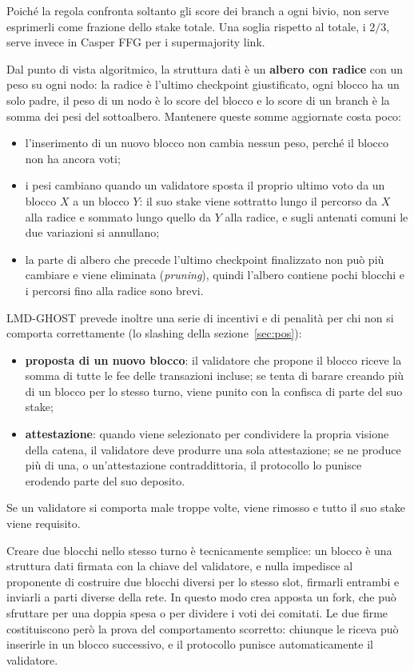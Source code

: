 \documentclass[a4paper, 11pt, oneside]{book}
\begin{document}
	Poiché la regola confronta soltanto gli score dei branch a ogni bivio, non serve
	esprimerli come frazione dello stake totale. Una soglia rispetto al totale, i $2/3$,
	serve invece in Casper FFG per i supermajority link.

	Dal punto di vista algoritmico, la struttura dati è un \textbf{albero con radice} con
	un peso su ogni nodo: la radice è l'ultimo checkpoint giustificato, ogni blocco ha un
	solo padre, il peso di un nodo è lo score del blocco e lo score di un branch è la
	somma dei pesi del sottoalbero. Mantenere queste somme aggiornate costa poco:
	\begin{itemize}
		\item l'inserimento di un nuovo blocco non cambia nessun peso, perché il blocco non
			ha ancora voti;
		\item i pesi cambiano quando un validatore sposta il proprio ultimo voto da un
			blocco $X$ a un blocco $Y$: il suo stake viene sottratto lungo il percorso da
			$X$ alla radice e sommato lungo quello da $Y$ alla radice, e sugli antenati
			comuni le due variazioni si annullano;
		\item la parte di albero che precede l'ultimo checkpoint finalizzato non può più
			cambiare e viene eliminata (\textit{pruning}), quindi l'albero contiene pochi
			blocchi e i percorsi fino alla radice sono brevi.
	\end{itemize}

	LMD-GHOST prevede inoltre una serie di incentivi e di penalità per chi non si
	comporta correttamente (lo slashing della sezione~\ref{sec:pos}):
	\begin{itemize}
		\item \textbf{proposta di un nuovo blocco}: il validatore che propone il blocco
			riceve la somma di tutte le fee delle transazioni incluse; se tenta di barare
			creando più di un blocco per lo stesso turno, viene punito con la confisca di
			parte del suo stake;
		\item \textbf{attestazione}: quando viene selezionato per condividere la propria
			visione della catena, il validatore deve produrre una sola attestazione; se ne
			produce più di una, o un'attestazione contraddittoria, il protocollo lo punisce
			erodendo parte del suo deposito.
	\end{itemize}
	Se un validatore si comporta male troppe volte, viene rimosso e tutto il suo stake
	viene requisito.

	Creare due blocchi nello stesso turno è tecnicamente semplice: un blocco è una
	struttura dati firmata con la chiave del validatore, e nulla impedisce al proponente
	di costruire due blocchi diversi per lo stesso slot, firmarli entrambi e inviarli a
	parti diverse della rete. In questo modo crea apposta un fork, che può sfruttare per
	una doppia spesa o per dividere i voti dei comitati. Le due firme costituiscono però
	la prova del comportamento scorretto: chiunque le riceva può inserirle in un blocco
	successivo, e il protocollo punisce automaticamente il validatore.
\end{document}
